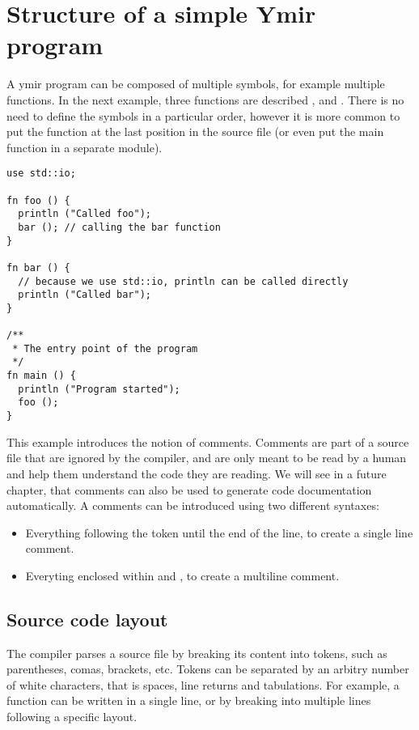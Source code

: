 \section{Structure of a simple Ymir program}

A ymir program can be composed of multiple symbols, for example multiple
functions. In the next example, three functions are described ,
 and . There is no need to define the symbols in a
particular order, however it is more common to put the  function at
the last position in the source file (or even put the main function in a
separate module).

\begin{lstlisting}[style=coloredverbatim, caption=First structured source file]
use std::io;

fn foo () {
  println ("Called foo");
  bar (); // calling the bar function
}

fn bar () {
  // because we use std::io, println can be called directly
  println ("Called bar");
}

/**
 * The entry point of the program
 */
fn main () {
  println ("Program started");
  foo ();
}
\end{lstlisting}

This example introduces the notion of comments. Comments are part of a source
file that are ignored by the compiler, and are only meant to be read by a human
and help them understand the code they are reading. We will see in a future
chapter, that comments can also be used to generate code documentation
automatically. A comments can be introduced using two different syntaxes:
\begin{itemize}
\item Everything following the token \token{//} until the end of the line, to
  create a single line comment.
\item Everyting enclosed within \token{/*} and \token{*/}, to create a multiline comment.
\end{itemize}

\subsection{Source code layout}

The compiler parses a source file by breaking its content into tokens, such as
parentheses, comas, brackets, etc. Tokens can be separated by an arbitry number
of white characters, that is spaces, line returns and tabulations. For example,
a function can be written in a single line, or by breaking into multiple lines
following a specific layout.


